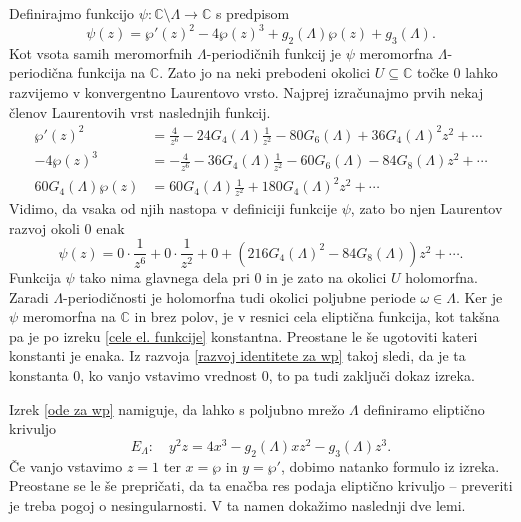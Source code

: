 \documentclass[mat1]{fmfdelo}
\numberwithin{equation}{section}
\newcommand{\C}{\mathbb C}
\newcommand{\om}{\omega}
\theoremstyle{definition}
\begin{document}
\begin{dokaz}
    Definirajmo funkcijo $\psi:\C\setminus\Lambda \to \C$ s predpisom
    \[
        \psi(z) = \wp'(z)^2 - 4\wp(z)^3 + g_2(\Lambda)\wp(z) + g_3(\Lambda).
    \]
    Kot vsota samih meromorfnih $\Lambda$-periodičnih funkcij je $\psi$ meromorfna $\Lambda$-periodična funkcija na $\C$. Zato jo na neki prebodeni okolici $U \subseteq \C$ točke $0$ lahko razvijemo v konvergentno Laurentovo vrsto. Najprej izračunajmo prvih nekaj členov Laurentovih vrst naslednjih funkcij.
    \begin{align*}
        \wp'(z)^2 &= \frac{4}{z^6} - 24G_4(\Lambda)\frac{1}{z^2} - 80G_6(\Lambda) + 36G_4(\Lambda)^2z^2 + \cdots \\
        -4\wp(z)^3 &= -\frac{4}{z^6} - 36G_4(\Lambda) \frac{1}{z^2} - 60G_6(\Lambda) - 84G_8(\Lambda)z^2 + \cdots \\
        60G_4(\Lambda)\wp(z) &= 60G_4(\Lambda)\frac{1}{z^2} + 180G_4(\Lambda)^2z^2 + \cdots  
    \end{align*}
    Vidimo, da vsaka od njih nastopa v definiciji funkcije $\psi$, zato bo njen Laurentov razvoj okoli $0$ enak
    \begin{equation}
        \label{razvoj identitete za wp}    
        \psi(z) = 0 \cdot \frac{1}{z^6} + 0 \cdot \frac{1}{z^2} + 0 + (216G_4(\Lambda)^2 - 84G_8(\Lambda))z^2 + \cdots.
    \end{equation}
    Funkcija $\psi$ tako nima glavnega dela pri $0$ in je zato na okolici $U$ holomorfna. Zaradi $\Lambda$-periodičnosti je holomorfna tudi okolici poljubne periode $\om\in\Lambda$. Ker je $\psi$ meromorfna na $\C$ in brez polov, je v resnici cela eliptična funkcija, kot takšna pa je po izreku \ref{cele el. funkcije} konstantna. Preostane le še ugotoviti kateri konstanti je enaka. Iz razvoja \eqref{razvoj identitete za wp} takoj sledi, da je ta konstanta $0$, ko vanjo vstavimo vrednost $0$, to pa tudi zaključi dokaz izreka.
\end{dokaz}

Izrek \ref{ode za wp} namiguje, da lahko s poljubno mrežo $\Lambda$ definiramo eliptično krivuljo
\begin{equation}
    \label{elipticna krivulja glede na mrezo}    
    E_\Lambda : \quad y^2 z = 4x^3 - g_2(\Lambda)x z^2 - g_3(\Lambda) z^3.
\end{equation}
Če vanjo vstavimo $z = 1$ ter $x = \wp$ in $y = \wp'$, dobimo natanko formulo iz izreka. Preostane se le še prepričati, da ta enačba res podaja eliptično krivuljo -- preveriti je treba pogoj o nesingularnosti. V ta namen dokažimo naslednji dve lemi.
\end{document}

